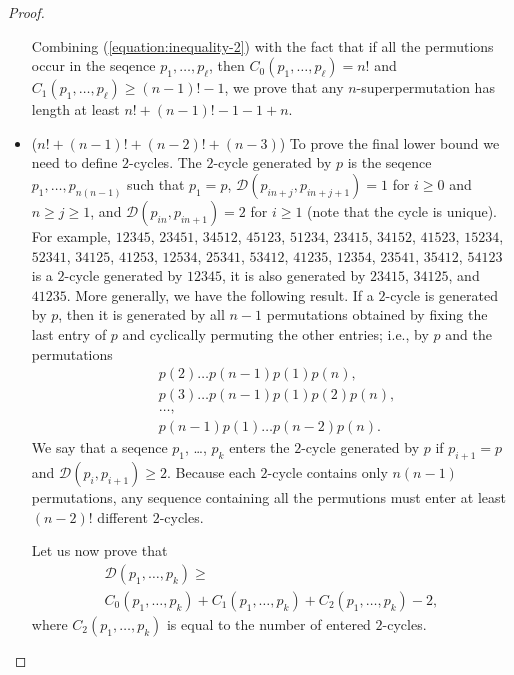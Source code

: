 \begin{proof}
\begin{itemize}
      Combining (\ref{equation:inequality-2}) with the
      fact that if all the
      permutions occur in the seqence $p_1, \dots, p_\ell$, then
      $C_0(p_1, \dots, p_\ell) = n!$ and $C_1(p_1, \dots, p_\ell) \ge
      (n - 1)! - 1$,
      we prove that any $n$-superpermutation has length at least
      $n! + (n - 1)! - 1 - 1 + n$.
    \item ($n! + (n - 1)! + (n - 2)! + (n - 3)$)
      To prove the final lower bound we need to define $2$-cycles. The $2$-cycle
      generated by $p$ is the seqence $p_1, \dots, p_{n(n - 1)}$ such that
      $p_1 = p$, $\mathcal{D}(p_{in + j}, p_{in + j + 1}) = 1$ for $i \ge 0$
      and $n \ge j \ge 1$, and $\mathcal{D}(p_{in}, p_{in + 1}) = 2$ for
      $i \ge 1$ (note that the cycle is unique). For example,
      $12345$, $23451$, $34512$, $45123$, $51234$, $23415$, $34152$, $41523$,
      $15234$, $52341$, $34125$, $41253$, $12534$, $25341$, $53412$, $41235$,
      $12354$, $23541$, $35412$, $54123$ is a $2$-cycle generated by $12345$,
      it is also generated by $23415$, $34125$, and $41235$. More generally, we
      have the following result. If a $2$-cycle is generated by $p$, then it is
      generated by all $n - 1$ permutations obtained by fixing the
      last entry of $p$ and cyclically permuting the other entries; i.e., by
      $p$ and the permutations
      \begin{align*}
        &p(2) \dots p(n - 1) p(1)p(n), \\
        &p(3) \dots p(n - 1) p(1) p(2) p(n), \\
        &\dots, \\
        &p(n - 1) p(1) \dots p(n - 2) p(n).
      \end{align*}
      We say that a seqence $p_1$, \dots, $p_k$ enters the $2$-cycle generated
      by $p$ if $p_{i + 1} = p$ and $\mathcal{D}(p_i, p_{i + 1}) \ge 2$.
      Because each $2$-cycle contains only $n (n - 1)$ permutations, any
      sequence containing all the permutions must enter at least $(n - 2)!$
      different $2$-cycles.

      Let us now prove that
      \begin{multline}
        \label{equation:inequality-3}
        \mathcal{D}(p_1, \dots, p_k) \ge \\
        C_0(p_1, \dots, p_k) + C_1(p_1, \dots, p_k) + C_2(p_1, \dots, p_k) - 2,
      \end{multline}
      where $C_2(p_1, \dots, p_k)$ is equal to the number of entered $2$-cycles.


\end{itemize}
\end{proof}
